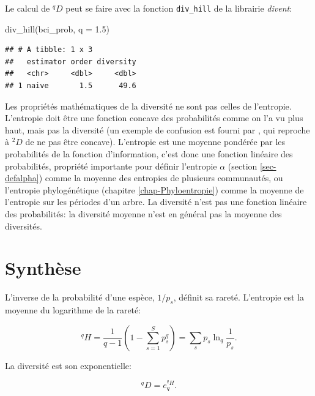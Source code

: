 \documentclass[
  11pt,
  american,
  a4paper,
  extrafontsizes,onecolumn,openright
  ]{memoir}
\newenvironment{Shaded}{\begin{snugshade}}{\end{snugshade}}
\newcommand{\AttributeTok}[1]{\textcolor[rgb]{0.77,0.63,0.00}{#1}}
\newcommand{\FloatTok}[1]{\textcolor[rgb]{0.00,0.00,0.81}{#1}}
\newcommand{\FunctionTok}[1]{\textcolor[rgb]{0.00,0.00,0.00}{#1}}
\newcommand{\NormalTok}[1]{#1}
\begin{document}
Le calcul de \(^{q}\!D\) peut se faire avec la fonction \texttt{div\_hill} de la librairie \emph{divent}:

\scriptsize

\begin{Shaded}
\begin{Highlighting}[]
\FunctionTok{div\_hill}\NormalTok{(bci\_prob, }\AttributeTok{q =} \FloatTok{1.5}\NormalTok{)}
\end{Highlighting}
\end{Shaded}

\begin{verbatim}
## # A tibble: 1 x 3
##   estimator order diversity
##   <chr>     <dbl>     <dbl>
## 1 naive       1.5      49.6
\end{verbatim}

\normalsize

Les propriétés mathématiques de la diversité ne sont pas celles de l'entropie.
L'entropie doit être une fonction concave des probabilités comme on l'a vu plus haut, mais pas la diversité (un exemple de confusion est fourni par \textcite{Gadagkar1989}, qui reproche à \(^{2}\!D\) de ne pas être concave).
L'entropie est une moyenne pondérée par les probabilités de la fonction d'information, c'est donc une fonction linéaire des probabilités, propriété importante pour définir l'entropie \(\alpha\) (section \ref{sec-defalpha}) comme la moyenne des entropies de plusieurs communautés, ou l'entropie phylogénétique (chapitre \ref{chap-Phyloentropie}) comme la moyenne de l'entropie sur les périodes d'un arbre.
La diversité n'est pas une fonction linéaire des probabilités: la diversité moyenne n'est en général pas la moyenne des diversités.

\hypertarget{synthuxe8se-1}{%
\section{Synthèse}\label{synthuxe8se-1}}

L'inverse de la probabilité d'une espèce, \(1/p_s\), définit sa rareté.
L'entropie est la moyenne du logarithme de la rareté:

\begin{equation}
  \label{eq:EntropieRarete}
  ^{q}\!H 
  = \frac{1}{q-1} \left( 1 - \sum^S_{s=1}{p^q_s} \right)
  = \sum_s{p_s}\ln_q\frac{1}{p_s}.
\end{equation}

La diversité est son exponentielle:

\begin{equation}
  \label{eq:DexpHSynthese}
  ^{q}\!D = e_q^{^{q}\!H}.
\end{equation}
\end{document}
